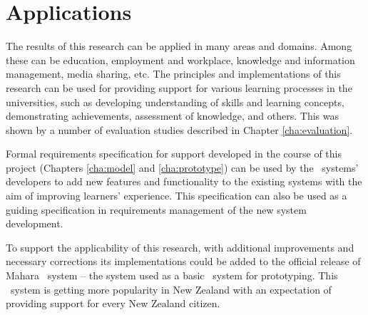 \section{Applications}

The results of this research can be applied in many areas and domains. Among
these can be education, employment and workplace, knowledge and information
management, media sharing, etc. The principles and implementations of this
research can be used for providing support for various learning processes in the
universities, such as developing understanding of skills and learning concepts,
demonstrating achievements, assessment of knowledge, and others. This was shown
by a number of evaluation studies described in Chapter \ref{cha:evaluation}.

Formal requirements specification for \LLLs support developed in the course of
this project (Chapters \ref{cha:model} and \ref{cha:prototype}) can be used by
the \ep~systems' developers to add new features and functionality to the
existing systems with the aim of improving learners' experience. This
specification can also be used as a guiding specification in requirements
management of the new system development.

To support the applicability of this research, with additional improvements
and necessary corrections its implementations could be added to the official
release of Mahara \ep~system -- the system used as a basic \ep~system for
prototyping. This \ep~system is getting more popularity in New Zealand with an
expectation of providing \LLLs support for every New Zealand citizen.
